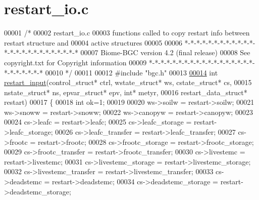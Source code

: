 \hypertarget{restart__io_8c_source}{}\section{restart\+\_\+io.\+c}
\label{restart__io_8c_source}

\begin{DoxyCode}
00001 \textcolor{comment}{/*}
00002 \textcolor{comment}{restart\_io.c}
00003 \textcolor{comment}{functions called to copy restart info between restart structure and}
00004 \textcolor{comment}{active structures}
00005 \textcolor{comment}{}
00006 \textcolor{comment}{*-*-*-*-*-*-*-*-*-*-*-*-*-*-*-*-*-*-*-*-*-*-*-*-*}
00007 \textcolor{comment}{Biome-BGC version 4.2 (final release)}
00008 \textcolor{comment}{See copyright.txt for Copyright information}
00009 \textcolor{comment}{*-*-*-*-*-*-*-*-*-*-*-*-*-*-*-*-*-*-*-*-*-*-*-*-*}
00010 \textcolor{comment}{*/}
00011 
00012 \textcolor{preprocessor}{#include "bgc.h"}
00013 
\hypertarget{restart__io_8c_source_l00014}{}\hyperlink{restart__io_8c_abbb2b2cf473fe2e7b5c1ac5f0790734d}{00014} \textcolor{keywordtype}{int} \hyperlink{restart__io_8c_abbb2b2cf473fe2e7b5c1ac5f0790734d}{restart\_input}(control\_struct* ctrl, wstate\_struct* ws, cstate\_struct* cs,
00015     nstate\_struct* ns, epvar\_struct* epv, \textcolor{keywordtype}{int}* metyr, 
00016     restart\_data\_struct* restart)
00017 \{
00018     \textcolor{keywordtype}{int} ok=1;
00019     
00020     ws->soilw                             = restart->soilw;
00021     ws->snoww                             = restart->snoww;
00022     ws->canopyw                           = restart->canopyw;
00023 
00024     cs->leafc                             = restart->leafc;
00025     cs->leafc\_storage                     = restart->leafc\_storage;
00026     cs->leafc\_transfer                    = restart->leafc\_transfer;
00027     cs->frootc                            = restart->frootc;
00028     cs->frootc\_storage                    = restart->frootc\_storage;
00029     cs->frootc\_transfer                   = restart->frootc\_transfer;
00030     cs->livestemc                         = restart->livestemc;
00031     cs->livestemc\_storage                 = restart->livestemc\_storage;
00032     cs->livestemc\_transfer                = restart->livestemc\_transfer;
00033     cs->deadstemc                         = restart->deadstemc;
00034     cs->deadstemc\_storage                 = restart->deadstemc\_storage;

\end{DoxyCode}
